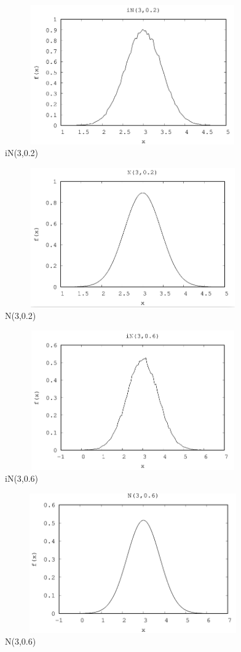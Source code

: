 \documentclass[]{article}
\begin{document}
\begin{figure}
	\centering
	\includegraphics[height=6cm,width=11cm]{images/iN302.png}
	\caption{iN(3,0.2)}
	\label{fig5}
\end{figure}

\begin{figure}
	\centering
	\includegraphics[height=6cm,width=11cm]{images/N302.png}
	\caption{N(3,0.2)}
	\label{fig6}
\end{figure}

\begin{figure}
	\centering
	\includegraphics[height=6cm,width=11cm]{images/iN306.png}
	\caption{iN(3,0.6)}
	\label{fig7}
\end{figure}

\begin{figure}
	\centering
	\includegraphics[height=6cm,width=11cm]{images/N306.png}
	\caption{N(3,0.6) }
	\label{fig8}
\end{figure}
\end{document}

